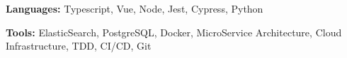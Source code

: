 \documentclass[letterpaper,11pt]{article}
\begin{document}

\begin{myitemize}

	\item \textbf{Languages: }{\normalsize Typescript, Vue, Node, Jest, Cypress, Python} 
\item \textbf{Tools: } {\normalsize ElasticSearch, PostgreSQL, Docker, MicroService Architecture, Cloud Infrastructure, TDD, CI/CD, Git}

\end{myitemize}


\end{document}
